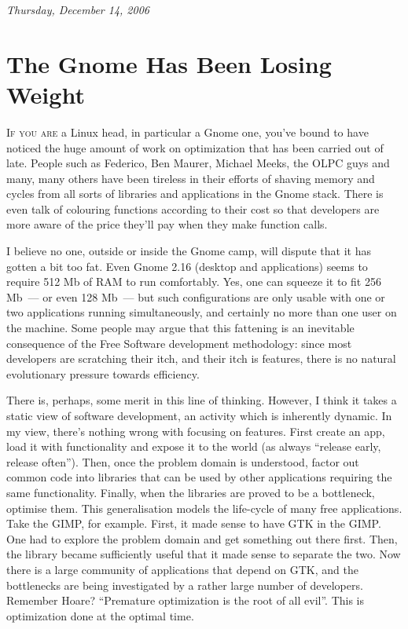\documentclass{book}
\begin{document}
\begin{flushright}
  \emph{Thursday, December 14, 2006}
\end{flushright}

\section{The Gnome Has Been Losing Weight}

\lettrine{I}{f you are} a Linux head, in particular a Gnome one,
you've bound to have noticed the huge amount of work on optimization
that has been carried out of late. People such as Federico, Ben
Maurer, Michael Meeks, the OLPC guys and many, many others have been
tireless in their efforts of shaving memory and cycles from all sorts
of libraries and applications in the Gnome stack. There is even talk
of colouring functions according to their cost so that developers are
more aware of the price they'll pay when they make function calls.

I believe no one, outside or inside the Gnome camp, will dispute that
it has gotten a bit too fat. Even Gnome 2.16 (desktop and
applications) seems to require 512 Mb of RAM to run comfortably. Yes,
one can squeeze it to fit 256 Mb~--- or even 128 Mb~--- but such
configurations are only usable with one or two applications running
simultaneously, and certainly no more than one user on the
machine. Some people may argue that this fattening is an inevitable
consequence of the Free Software development methodology: since most
developers are scratching their itch, and their itch is features,
there is no natural evolutionary pressure towards efficiency.

There is, perhaps, some merit in this line of thinking. However, I
think it takes a static view of software development, an activity
which is inherently dynamic. In my view, there's nothing wrong with
focusing on features. First create an app, load it with functionality
and expose it to the world (as always ``release early, release
often''). Then, once the problem domain is understood, factor out
common code into libraries that can be used by other applications
requiring the same functionality. Finally, when the libraries are
proved to be a bottleneck, optimise them. This generalisation models
the life-cycle of many free applications. Take the GIMP, for
example. First, it made sense to have GTK in the GIMP. One had to
explore the problem domain and get something out there first. Then,
the library became sufficiently useful that it made sense to separate
the two. Now there is a large community of applications that depend on
GTK, and the bottlenecks are being investigated by a rather large
number of developers. Remember Hoare? ``Premature optimization is the
root of all evil''. This is optimization done at the optimal time.
\end{document}
